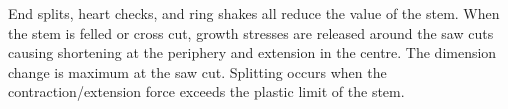End splits, heart checks, and ring shakes all reduce the value of the stem. When the stem is felled or cross cut, growth stresses are released
around the saw cuts causing shortening at the periphery and extension in the
centre. The dimension change is maximum at the saw cut. Splitting occurs when the contraction/extension force exceeds the plastic
limit of the stem.